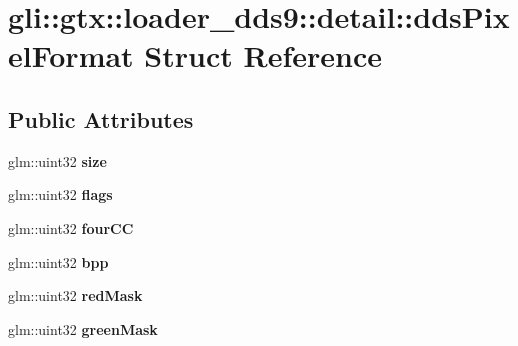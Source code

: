 \hypertarget{structgli_1_1gtx_1_1loader__dds9_1_1detail_1_1ddsPixelFormat}{\section{gli\-:\-:gtx\-:\-:loader\-\_\-dds9\-:\-:detail\-:\-:dds\-Pixel\-Format \-Struct \-Reference}
\label{structgli_1_1gtx_1_1loader__dds9_1_1detail_1_1ddsPixelFormat}
}
\subsection*{\-Public \-Attributes}
\begin{DoxyCompactItemize}
\item 
\hypertarget{structgli_1_1gtx_1_1loader__dds9_1_1detail_1_1ddsPixelFormat_ad56ff36067c26c669d1fa65ad5482705}{glm\-::uint32 {\bfseries size}}\label{structgli_1_1gtx_1_1loader__dds9_1_1detail_1_1ddsPixelFormat_ad56ff36067c26c669d1fa65ad5482705}

\item 
\hypertarget{structgli_1_1gtx_1_1loader__dds9_1_1detail_1_1ddsPixelFormat_ab415c445e4ee666ab1e4012cd3b158d9}{glm\-::uint32 {\bfseries flags}}\label{structgli_1_1gtx_1_1loader__dds9_1_1detail_1_1ddsPixelFormat_ab415c445e4ee666ab1e4012cd3b158d9}

\item 
\hypertarget{structgli_1_1gtx_1_1loader__dds9_1_1detail_1_1ddsPixelFormat_a395e780af1cd63b8a680ab20eed625ee}{glm\-::uint32 {\bfseries four\-C\-C}}\label{structgli_1_1gtx_1_1loader__dds9_1_1detail_1_1ddsPixelFormat_a395e780af1cd63b8a680ab20eed625ee}

\item 
\hypertarget{structgli_1_1gtx_1_1loader__dds9_1_1detail_1_1ddsPixelFormat_a6ba13bd5c91fac7270029870adf173a7}{glm\-::uint32 {\bfseries bpp}}\label{structgli_1_1gtx_1_1loader__dds9_1_1detail_1_1ddsPixelFormat_a6ba13bd5c91fac7270029870adf173a7}

\item 
\hypertarget{structgli_1_1gtx_1_1loader__dds9_1_1detail_1_1ddsPixelFormat_a9a17bdc867b30e342bdde3c5827ac19a}{glm\-::uint32 {\bfseries red\-Mask}}\label{structgli_1_1gtx_1_1loader__dds9_1_1detail_1_1ddsPixelFormat_a9a17bdc867b30e342bdde3c5827ac19a}

\item 
\hypertarget{structgli_1_1gtx_1_1loader__dds9_1_1detail_1_1ddsPixelFormat_a4190e226247408312ace9a254e6c2349}{glm\-::uint32 {\bfseries green\-Mask}}\label{structgli_1_1gtx_1_1loader__dds9_1_1detail_1_1ddsPixelFormat_a4190e226247408312ace9a254e6c2349}


\end{DoxyCompactItemize}
